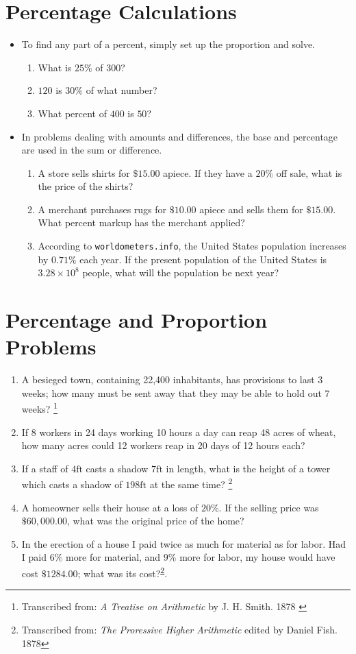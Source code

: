 \documentclass{article}
\begin{document}
\section*{Percentage Calculations}
\begin{itemize}
    \item To find any part of a percent, simply set up the proportion and solve.
    \begin{enumerate}
    \item What is $25\%$ of $300$?
    \item $120$ is $30\%$ of what number?
    \item What percent of $400$ is $50$?
    \end{enumerate}
    \item In problems dealing with amounts and differences, the base and percentage are used in the sum or difference.
    \begin{enumerate}
        \item A store sells shirts for $\$15.00$ apiece. If they have a $20\%$ off sale, what is the price of the shirts?
        \item A merchant purchases rugs for $\$10.00$ apiece and sells them for $\$15.00$.  What percent markup has the merchant applied?
        \item According to {\tt worldometers.info}, the United States population increases by $0.71\%$ each year.  If the present population of the United States is $3.28 \times 10^{8}$ people, what will the population be next year?
    \end{enumerate}
\end{itemize}

\section*{Percentage and Proportion Problems}
\begin{enumerate}
  \item A besieged town, containing 22,400 inhabitants, has provisions to last 3 weeks; how many must be sent away that they may be able to hold out 7 weeks? \footnote{Transcribed from: {\em A Treatise on Arithmetic} by J. H. Smith. 1878 \label{fn:treatise}}
  \item  If 8 workers in 24 days working 10 hours a day can reap 48 acres of wheat, how many acres could 12 workers reap in 20 days of 12 hours each?
  \item If a staff of $4\mathrm{ft}$ casts a shadow $7\mathrm{ft}$ in length, what is the height of a tower which casts a shadow of $198\mathrm{ft}$ at the same time? \footnote{Transcribed from: {\em The Proressive Higher Arithmetic} edited by Daniel Fish. 1878\label{fn:higher}}
  \item A homeowner sells their house at a loss of $20\%$.  If the selling price was 
  $\$60,000.00$, what was the original price of the home?
  \item In the erection of a house I paid twice as much for material
  as for labor.  Had I paid $6\%$ more for material, and $9\%$ more
  for labor, my house would have cost $\$1284.00$; what was its
  cost?\textsuperscript{\ref{fn:higher}}.
\end{enumerate}
\end{document}
